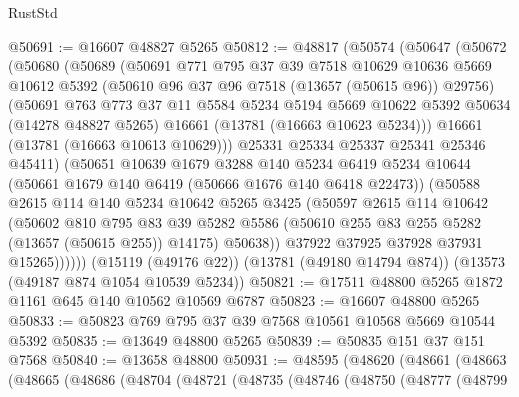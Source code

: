 \begin{lexlean}{RustStd}
\begin{coremodule}
@50691 := @16607 @48827 @5265
@50812 := @48817
    (@50574
      (@50647
        (@50672
          (@50680
            (@50689
              (@50691
                @771
                @795
                @37
                @39
                @7518
                @10629
                @10636
                @5669
                @10612
                @5392
                (@50610 @96 @37 @96 @7518 (@13657 (@50615 @96)) @29756)
                (@50691
                  @763
                  @773
                  @37
                  @11
                  @5584
                  @5234
                  @5194
                  @5669
                  @10622
                  @5392
                  @50634
                  (@14278 @48827 @5265)
                  @16661
                  (@13781 (@16663 @10623 @5234)))
                @16661
                (@13781 (@16663 @10613 @10629)))
              @25331
              @25334
              @25337
              @25341
              @25346
              @45411)
            (@50651
              @10639
              @1679
              @3288
              @140
              @5234
              @6419
              @5234
              @10644
              (@50661 @1679 @140 @6419 (@50666 @1676 @140 @6418 @22473))
              (@50588
                @2615
                @114
                @140
                @5234
                @10642
                @5265
                @3425
                (@50597
                  @2615
                  @114
                  @10642
                  (@50602
                    @810
                    @795
                    @83
                    @39
                    @5282
                    @5586
                    (@50610 @255 @83 @255 @5282 (@13657 (@50615 @255)) @14175)
                    @50638))
                @37922
                @37925
                @37928
                @37931
                @15265))))))
    (@15119 (@49176 @22))
    (@13781 (@49180 @14794 @874))
    (@13573 (@49187 @874 @1054 @10539 @5234))
@50821 := @17511 @48800 @5265 @1872 @1161 @645 @140 @10562 @10569 @6787
@50823 := @16607 @48800 @5265
@50833 := @50823 @769 @795 @37 @39 @7568 @10561 @10568 @5669 @10544 @5392
@50835 := @13649 @48800 @5265
@50839 := @50835 @151 @37 @151 @7568
@50840 := @13658 @48800
@50931 := @48595
    (@48620
      (@48661
        (@48663
          (@48665
            (@48686
              (@48704
                (@48721
                  (@48735
                    (@48746
                      (@48750
                        (@48777
                          (@48799

\end{coremodule}
\end{lexlean}

